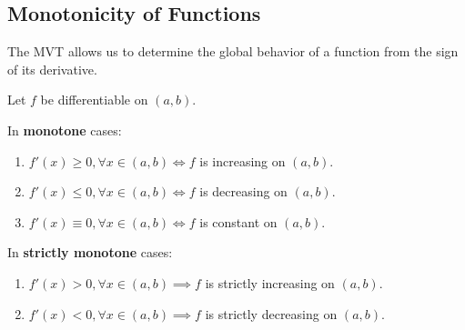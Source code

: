 \documentclass[
	UTF-8,
	11pt, %
	a4paper, %
]{LegrandOrangeBook}
\begin{document}
    \newpage

    \subsection{Monotonicity of Functions}

    The MVT allows us to determine the global behavior of a function from the sign of its derivative.

    \begin{theorem}
    Let $f$ be differentiable on $(a, b)$.

    In \textbf{monotone} cases:
    \begin{enumerate}
        \item $f'(x) \ge 0, \forall x \in (a, b) \iff f$ is increasing on $(a, b)$.
        \item $f'(x) \le 0, \forall x \in (a, b) \iff f$ is decreasing on $(a, b)$.
        \item $f'(x) \equiv 0, \forall x \in (a, b) \iff f$ is constant on $(a, b)$.
    \end{enumerate}

    In \textbf{strictly monotone} cases:
    \begin{enumerate}
        \item $f'(x) > 0, \forall x \in (a, b) \implies f$ is strictly increasing on $(a, b)$.
        \item $f'(x) < 0, \forall x \in (a, b) \implies f$ is strictly decreasing on $(a, b)$.
    \end{enumerate}
    \end{theorem}
\end{document}
